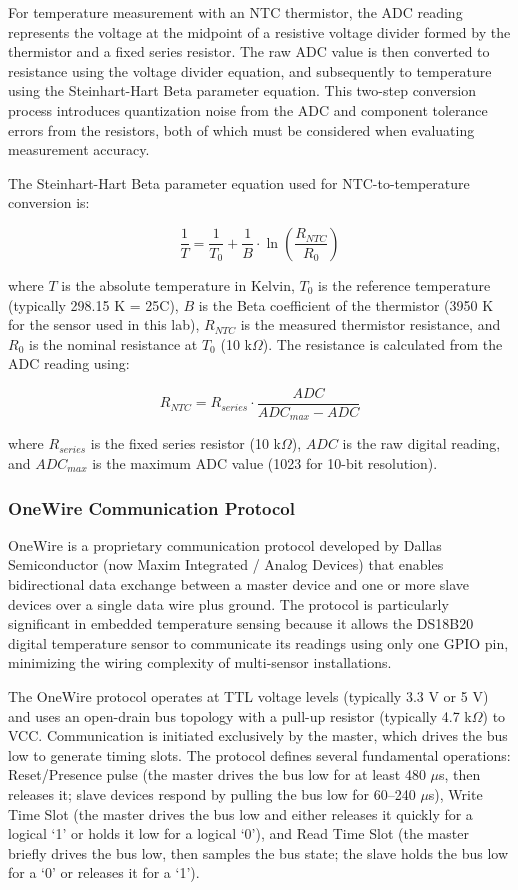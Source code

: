 For temperature measurement with an NTC thermistor, the ADC reading represents the voltage at the midpoint of a resistive voltage divider formed by the thermistor and a fixed series resistor. The raw ADC value is then converted to resistance using the voltage divider equation, and subsequently to temperature using the Steinhart-Hart Beta parameter equation. This two-step conversion process introduces quantization noise from the ADC and component tolerance errors from the resistors, both of which must be considered when evaluating measurement accuracy.

The Steinhart-Hart Beta parameter equation used for NTC-to-temperature conversion is:

$$\frac{1}{T} = \frac{1}{T_0} + \frac{1}{B} \cdot \ln\left(\frac{R_{NTC}}{R_0}\right)$$

where $T$ is the absolute temperature in Kelvin, $T_0$ is the reference temperature (typically 298.15 K = 25\textdegree C), $B$ is the Beta coefficient of the thermistor (3950 K for the sensor used in this lab), $R_{NTC}$ is the measured thermistor resistance, and $R_0$ is the nominal resistance at $T_0$ (10 k$\Omega$). The resistance is calculated from the ADC reading using:

$$R_{NTC} = R_{series} \cdot \frac{ADC}{ADC_{max} - ADC}$$

where $R_{series}$ is the fixed series resistor (10 k$\Omega$), $ADC$ is the raw digital reading, and $ADC_{max}$ is the maximum ADC value (1023 for 10-bit resolution).

\subsubsection{OneWire Communication Protocol}

OneWire is a proprietary communication protocol developed by Dallas Semiconductor (now Maxim Integrated / Analog Devices) that enables bidirectional data exchange between a master device and one or more slave devices over a single data wire plus ground. The protocol is particularly significant in embedded temperature sensing because it allows the DS18B20 digital temperature sensor to communicate its readings using only one GPIO pin, minimizing the wiring complexity of multi-sensor installations.

The OneWire protocol operates at TTL voltage levels (typically 3.3 V or 5 V) and uses an open-drain bus topology with a pull-up resistor (typically 4.7 k$\Omega$) to VCC. Communication is initiated exclusively by the master, which drives the bus low to generate timing slots. The protocol defines several fundamental operations: Reset/Presence pulse (the master drives the bus low for at least 480 $\mu$s, then releases it; slave devices respond by pulling the bus low for 60--240 $\mu$s), Write Time Slot (the master drives the bus low and either releases it quickly for a logical `1' or holds it low for a logical `0'), and Read Time Slot (the master briefly drives the bus low, then samples the bus state; the slave holds the bus low for a `0' or releases it for a `1').


